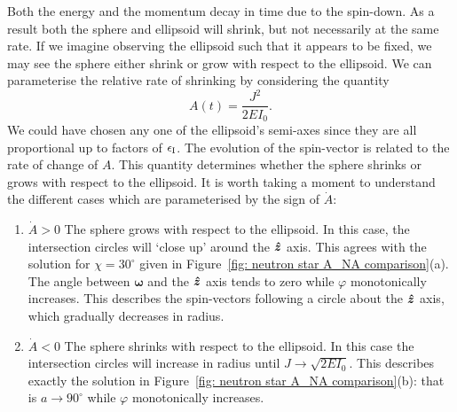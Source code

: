\documentclass[../full_thesis/full_thesis.tex]{subfiles}
\begin{document}
Both the energy and the momentum decay in time
due to the spin-down. As a result both the sphere and ellipsoid will shrink, but
not necessarily at the same rate. If we imagine observing the ellipsoid such
that it appears to be fixed, we may see the sphere either shrink or grow with
respect to the ellipsoid. We can parameterise the relative rate of shrinking by
considering the quantity
\begin{equation}
A(t)  = \frac{J^{2}} {2EI_{0}}.
\label{eqn: A}
\end{equation}
We could have chosen any one of the ellipsoid's semi-axes since they are all
proportional up to factors of $\epsilon_{\mathrm{I}}$. The evolution of the spin-vector is
related to the rate of change of $A$.
This quantity determines whether the sphere shrinks or grows with respect to
the ellipsoid. It is worth taking a moment to understand the different cases
which are parameterised by the sign of $\dot{A}$:
\begin{enumerate}
\item $\dot{A}>0$ The sphere grows with respect to the ellipsoid. In this case,
    the intersection circles will `close up' around the $\boldsymbol{\hat{z}}$ axis. This
    agrees with the solution for $\chi=30^{\circ}$ given in
    Figure~\ref{fig: neutron star A_NA comparison}(a). The angle between
    $\boldsymbol{\omega}$ and the $\boldsymbol{\hat{z}}$ axis tends to zero while $\varphi$
    monotonically increases. This describes the spin-vectors following a circle
    about the $\boldsymbol{\hat{z}}$ axis, which gradually decreases in radius.
\item $\dot{A}<0$ The sphere shrinks with respect to the ellipsoid. In this
    case the intersection circles will increase in radius until $J\rightarrow
    \sqrt{2EI_{0}}$. This describes exactly the solution in
    Figure~\ref{fig: neutron star A_NA comparison}(b): that is $a\rightarrow
    90^{\circ}$ while $\varphi$ monotonically increases.
\end{enumerate}
\end{document}
